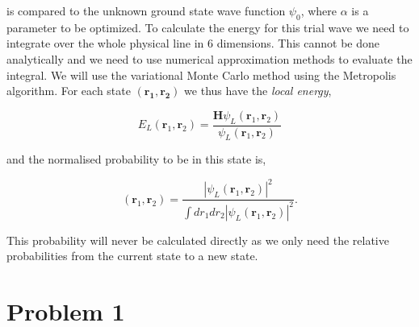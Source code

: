 is compared to the unknown ground state wave function $\psi_0$, where $\alpha$ is a parameter to be optimized. To calculate the energy for this trial wave we need to integrate over the whole physical line in 6 dimensions. This cannot be done analytically and we need to use numerical approximation methods to evaluate the integral. We will use the variational Monte Carlo method using the Metropolis algorithm. For each state $(\mathbf{r_1},\mathbf{r_2})$ we thus have the \textit{local energy},

\begin{equation}
E_{L}(\mathbf{r}_1,\mathbf{r}_2)= \frac{\mathbf{H}\psi_L(\mathbf{r}_1,\mathbf{r}_2)}{\psi_L(\mathbf{r}_1,\mathbf{r}_2)}
\end{equation}

and the normalised probability to be in this state is,

\begin{equation}
(\mathbf{r}_1,\mathbf{r}_2)=\frac{|\psi_L(\mathbf{r}_1,\mathbf{r}_2)|^2}{\int dr_1dr_2|\psi_L(\mathbf{r}_1,\mathbf{r}_2)|^2}.
\end{equation}

This probability will never be calculated directly as we only need the relative probabilities from the current state to a new state.


\section*{Problem 1}

